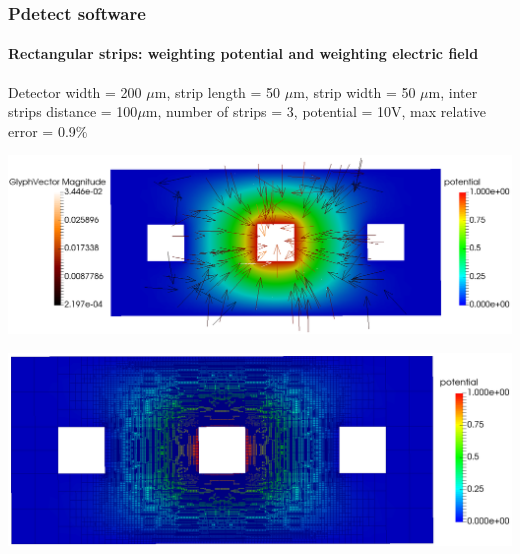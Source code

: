 \documentclass[14pt]{beamer}
\begin{document}
\begin{frame}
  \frametitle{Pdetect software}
  \framesubtitle{Rectangular strips: weighting potential and weighting electric field}

  \fontsize{10pt}{7.2}\selectfont


  Detector width = 200 $\mu$m, strip length = 50 $\mu$m, strip width = 50 $\mu$m,
	inter strips distance = 100$\mu$m, number of strips = 3, potential = 10V,
	max relative error = 0.9$\%$

  \begin{center}
  \includegraphics[scale=0.18]{images/rect_rect_pot_3_weight.png}
  \end{center}

\vspace{-2em}

  \begin{center}
  \hspace{4em} \includegraphics[scale=0.15]{images/rect_rect_pot_3_weight_grid.png}
  \end{center}

\end{frame}
\end{document}
